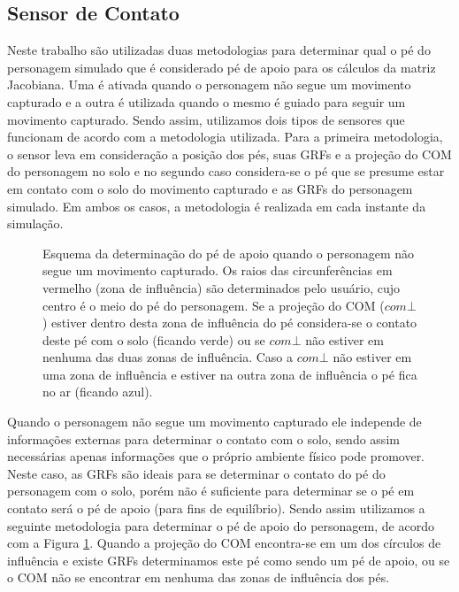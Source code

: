 \documentclass[tog]{acmsiggraph}
\begin{document}
\subsection{Sensor de Contato}

Neste trabalho são utilizadas duas metodologias para determinar qual o pé do personagem simulado que é considerado pé de apoio
para os cálculos da matriz Jacobiana. Uma é ativada quando o personagem não segue um movimento capturado e a outra é utilizada 
quando o mesmo é guiado para seguir um movimento capturado. Sendo assim, utilizamos dois tipos de sensores que funcionam de 
acordo com a metodologia utilizada. Para a primeira metodologia, o sensor leva em consideração a posição dos pés, suas GRFs e a 
projeção do COM do personagem no solo e no segundo caso considera-se o pé que se presume estar em contato com o solo do 
movimento capturado e as GRFs do personagem simulado. Em ambos os casos, a metodologia é realizada em cada instante da simulação.

\begin{figure}[!ht]
\centering
\def\svgwidth{\columnwidth}

\caption{Esquema da determinação do pé de apoio quando o personagem não segue um movimento capturado. Os raios das circunferências
         em vermelho (zona de influência) são determinados pelo usuário, cujo centro é o meio do pé do personagem. 
         Se a projeção do COM ($com\bot$) estiver dentro desta zona de influência do pé considera-se o contato deste pé com o solo (ficando verde)
         ou se $com\bot$ não estiver em nenhuma das duas zonas de influência. Caso a $com\bot$ não estiver em uma zona de influência
         e estiver na outra zona de influência o pé fica no ar (ficando azul).}
\label{fig:sensortroca}
\end{figure}

Quando o personagem não segue um movimento capturado ele independe de informações externas para determinar o contato com o solo,
sendo assim necessárias apenas informações que o próprio ambiente físico pode promover. Neste caso, as GRFs são ideais para se 
determinar o contato do pé do personagem com o solo, porém não é suficiente para determinar se o pé em contato será o pé de 
apoio (para fins de equilíbrio). Sendo assim utilizamos a seguinte metodologia para determinar o pé de apoio do personagem, de 
acordo com a Figura \ref{fig:sensortroca}. Quando a projeção do COM encontra-se em um dos círculos de influência e existe GRFs 
determinamos este pé como sendo um pé de apoio, ou se o COM não se encontrar em nenhuma das zonas de influência dos pés.
\end{document}
